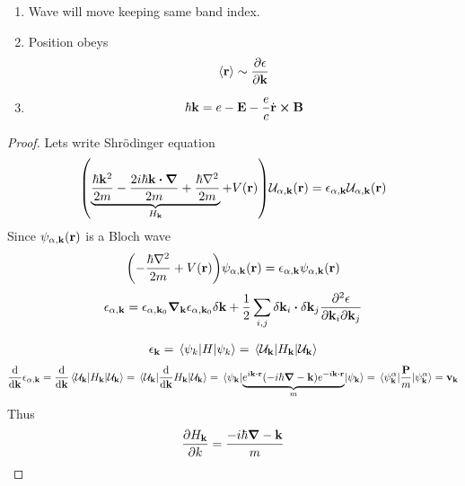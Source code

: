 \begin{prop}
	
	\begin{enumerate}
		\item Wave will move keeping same band index.
		\item Position obeys 
		\begin{align}
		\expval{\vb{r}} \sim \pdv{\epsilon}{\vb{k}}
		\end{align}
		\item 
		\begin{align}
		\hbar \vb{k} = e-\vb{E} - \frac{e}{c} \dot{\vb{r}} \cross \vb{B}
		\end{align}
	\end{enumerate}
\begin{proof}
	Lets write Shr\"{o}dinger equation
	\begin{align}
	\qty(\underbrace{\frac{\hbar \vb{k}^2}{2m}-\frac{2i\hbar \vb{k} \vdot \vb{\grad}}{2m}+\frac{\hbar \laplacian}{2m}}_{H_{\vb{k}}} + V(\vb{r})) \mathcal{U}_{\alpha, \vb{k}}(\vb{r}) = \epsilon_{\alpha, \vb{k}}\mathcal{U}_{\alpha, \vb{k}}(\vb{r}) 
	\end{align}
	Since $\psi_{\alpha, \vb{k}}(\vb{r}) $ is a Bloch wave
	\begin{align}
	\qty(-\frac{\hbar \laplacian}{2m} + V(\vb{r})) \psi_{\alpha, \vb{k}}(\vb{r}) = \epsilon_{\alpha, \vb{k}}\psi_{\alpha, \vb{k}}(\vb{r}) 
	\end{align}
	\begin{align}
	\epsilon_{\alpha, \vb{k}} = \epsilon_{\alpha, \vb{k}_0} \grad_{\vb{k}}\epsilon_{\alpha, \vb{k}_0} \delta \vb{k} + \frac{1}{2} \sum_{i,j} \delta \vb{k}_i \vdot \delta \vb{k}_j \pdv{\epsilon}{\vb{k}_i }{\vb{k}_j}
	\end{align}
	
	\begin{align}
	\epsilon_{\vb{k}} = \ev{H}{\psi_k} = \ev{H_{\vb{k}}}{\mathcal{U}_{\vb{k}}}
	\end{align}
	\begin{align}
	\dv{\vb{k}}\epsilon_{\alpha, \vb{k}} = \dv{\vb{k}}\ev{H_{\vb{k}}}{\mathcal{U}_{\vb{k}}} =  \ev{\dv{\vb{k}}H_{\vb{k}}}{\mathcal{U}_{\vb{k}}} = \ev{\underbrace{e^{i\vb{k}\vdot \vb{r}}\qty(-i\hbar \grad -\vb{k} )e^{-i\vb{k}\vdot \vb{r}}}_m}{\psi_{\vb{k}}}= \ev{\frac{\vb{P}}{m}}{\psi^\alpha_{\vb{k}}} = \vb{v}_{\vb{k}}
	\end{align}
	Thus
	\begin{align}
	\pdv{H_{\vb{k}}}{k} = \frac{-i\hbar \grad -\vb{k}}{m}
	\end{align}
	

\end{proof}
\end{prop}

